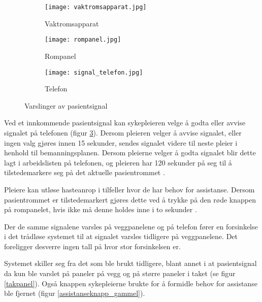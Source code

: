 \begin{figure}[H]
        \centering
         \begin{subfigure}[b]{0.3\textwidth}
        		\centering
                \texttt{[image: vaktromsapparat.jpg]}
                \caption{Vaktromsapparat}
                \label{rompanel}
        \end{subfigure}
        \begin{subfigure}[b]{0.3\textwidth}
        		\centering
                \texttt{[image: rompanel.jpg]}
                \caption{Rompanel}
                \label{rompanel}
        \end{subfigure}
          \begin{subfigure}[b]{0.3\textwidth}
        		\centering
                \texttt{[image: signal\_telefon.jpg]}
                \caption{Telefon}
                \label{signal_telefon}
        \end{subfigure}      
        \caption{Varslinger av pasientsignal}
        \label{varslinger}
\end{figure}

\noindent
Ved et innkommende pasientsignal kan sykepleieren velge å godta eller avvise signalet på telefonen (figur \ref{signal_telefon}). Dersom pleieren velger å avvise signalet, eller ingen valg gjøres innen 15 sekunder, sendes signalet videre til neste pleier i henhold til bemanningsplanen. Dersom pleierne velger å godta signalet blir dette lagt i arbeidslisten på telefonen, og pleieren har 120 sekunder på seg til å tilstedemarkere seg på det aktuelle pasientrommet \citep{BrukermanualforPasientsignalogPasientsignalapplikasjon}. 

\noindent
Pleiere kan utløse hasteanrop i tilfeller hvor de har behov for assistanse. Dersom pasientrommet er tilstedemarkert gjøres dette ved å trykke på den røde knappen på rompanelet, hvis ikke må denne holdes inne i to sekunder \citep{BrukerveiledningforPasientsignal}.

\noindent
Der de samme signalene varsles på veggpanelene og på telefon fører en forsinkelse i det trådløse systemet til at signalet varsles tidligere på veggpanelene. Det foreligger desverre ingen tall på hvor stor forsinkelsen er. 

\noindent
Systemet skiller seg fra det som ble brukt tidligere, blant annet i at pasientsignal da kun ble varslet på paneler på vegg og på større paneler i taket (se figur \ref{takpanel}). Også knappen sykepleierne brukte for å formidle behov for assistanse ble fjernet (figur \ref{assistanseknapp_gammel}). 


